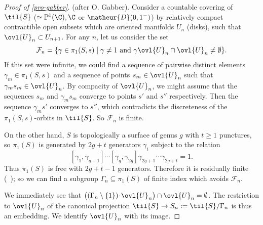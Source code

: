 \begin{proof}[Proof of \ref{pro-gabber}] (after O. Gabber).
 Consider a countable covering of $\til{S}$
 ($\simeq \mathbb{P}^1(\C),\C$ or $\matheur{D}(0,1^-)$) by
 relatively compact contractible open subsets which are oriented
 manifolds $U_n$ (\eg disks), such that $\ovl{U}_n\subset U_{n+1}$. For
 any $n$, let us consider the set
 \begin{equation*}
 \mathcal{F}_n=\{\gamma \in \pi_1(S,s)\mid
 \gamma\neq 1\text{ and }\gamma\ovl{U}_n \cap \ovl{U}_n \neq \emptyset\}.
 \end{equation*}
 If this set were infinite, we could find a sequence of
 pairwise distinct elements $\gamma_m \in \pi_1(S,s)$ and a sequence of
 points $s_m\in \ovl{U}_n$ such that $\gamma_m s_m\in \ovl{U}_n$. By
 compacity of $\ovl{U}_n$, we might assume that the sequences $s_m$ and
 $\gamma_m s_m$ converge to points $s'$ and $s''$ respectively. Then the
 sequence $\gamma_m s'$ converges to $s''$, which contradicts the
 discreteness of the $\pi_1(S,s)$-orbits in $\til{S}$.  So
 $\mathscr{F}_n$ is finite.

 On the other hand, $S$ is topologically a surface of genus
 $g$ with $t\geq 1$ punctures, so $\pi_1(S)$ is generated by $2g+t$
 generators $\gamma_i$ subject to the relation
 $$[\gamma_1,\gamma_{g+1}]\cdots[\gamma_g,\gamma_{2g}]\gamma_{2g+1}\cdots
 \gamma_{2g+t}=1.$$ Thus $\pi_1(S)$ is free with $2g+t-1$
 generators.  Therefore it is residually finite (\cf\ \cite[p.\ 150, ex.\
 34]{a1}); so we can find a subgroup $\Gamma_n\subseteq\pi_1(S)$ of
 finite index which avoids $\mathscr{F}_n$.

 We immediately see that 
 $\bigl((\Gamma_n\setminus\{1\})\!\cdot\!\ovl{U}_n\bigr)\cap\ovl{U}_n =
 \emptyset$.
 The restriction to $\ovl{U}_n$ of the canonical projection $\til{S}
 \rightarrow S_n := \til{S}/\Gamma_n$ is thus an embedding.
 We identify $\ovl{U}_n$ with its image.


\end{proof}

